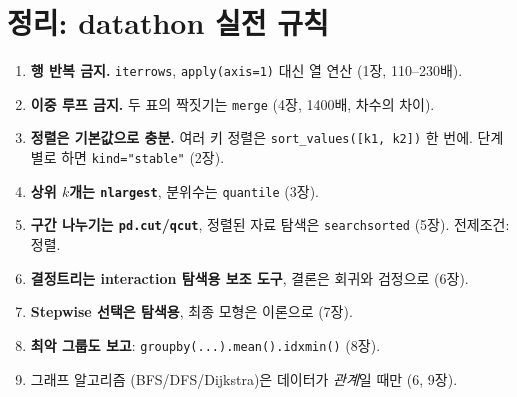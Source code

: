 \documentclass[11pt,a4paper]{article}
\newcommand{\code}[1]{\texttt{#1}}
\begin{document}
\section{정리: datathon 실전 규칙}
\begin{enumerate}
\item \textbf{행 반복 금지.} \code{iterrows}, \code{apply(axis=1)} 대신 열 연산 (1장, 110–230배).
\item \textbf{이중 루프 금지.} 두 표의 짝짓기는 \code{merge} (4장, 1400배, 차수의 차이).
\item \textbf{정렬은 기본값으로 충분.} 여러 키 정렬은 \code{sort\_values([k1, k2])} 한 번에. 단계별로 하면 \code{kind="stable"} (2장).
\item \textbf{상위 $k$개는 \code{nlargest}}, 분위수는 \code{quantile} (3장).
\item \textbf{구간 나누기는 \code{pd.cut}/\code{qcut}}, 정렬된 자료 탐색은 \code{searchsorted} (5장). 전제조건: 정렬.
\item \textbf{결정트리는 interaction 탐색용 보조 도구}, 결론은 회귀와 검정으로 (6장).
\item \textbf{Stepwise 선택은 탐색용}, 최종 모형은 이론으로 (7장).
\item \textbf{최악 그룹도 보고}: \code{groupby(...).mean().idxmin()} (8장).
\item 그래프 알고리즘 (BFS/DFS/Dijkstra)은 데이터가 \emph{관계}일 때만 (6, 9장).
\end{enumerate}

\end{document}

